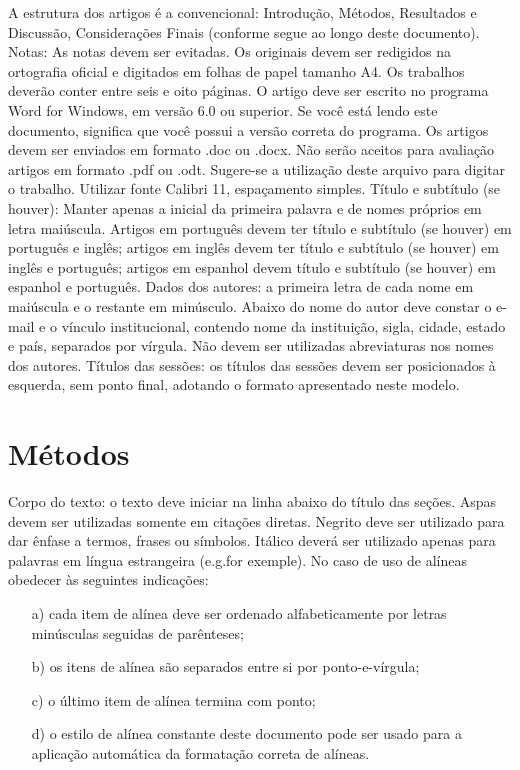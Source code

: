 \documentclass{modelo}
\begin{document}
 A estrutura dos artigos é a convencional: Introdução, Métodos, Resultados e Discussão, Considerações Finais (conforme segue ao longo deste documento).
 Notas: As notas devem ser evitadas.
 Os originais devem ser redigidos na ortografia oficial e digitados em folhas de papel tamanho A4. Os trabalhos deverão conter entre seis e oito páginas. O artigo deve ser escrito no programa Word for Windows, em versão 6.0 ou superior. Se você está lendo este documento, significa que você possui a versão correta do programa. Os artigos devem ser enviados em formato .doc ou .docx. Não serão aceitos para avaliação artigos em formato .pdf ou .odt. Sugere-se a utilização deste arquivo para digitar o trabalho.
 Utilizar fonte Calibri 11, espaçamento simples.
 Título e subtítulo (se houver): Manter apenas a inicial da primeira palavra e de nomes próprios em letra maiúscula. Artigos em português devem ter título e subtítulo (se houver) em português e inglês; artigos em inglês devem ter título e subtítulo (se houver) em inglês e português; artigos em espanhol devem título e subtítulo (se houver) em espanhol e português.
 Dados dos autores: a primeira letra de cada nome em maiúscula e o restante em minúsculo. Abaixo do nome do autor deve constar o e-mail e o vínculo institucional, contendo nome da instituição, sigla, cidade, estado e país, separados por vírgula. Não devem ser utilizadas abreviaturas nos nomes dos autores.
 Títulos das sessões: os títulos das sessões devem ser posicionados à esquerda, sem ponto final, adotando o formato apresentado neste modelo.
 
\section{Métodos}
Corpo do texto: o texto deve iniciar na linha abaixo do título das seções.
Aspas devem ser utilizadas somente em citações diretas. Negrito deve ser utilizado para dar ênfase a termos, frases ou símbolos. Itálico deverá ser utilizado apenas para palavras em língua estrangeira (e.g.for exemple).
No caso de uso de alíneas obedecer às seguintes indicações:
\begin{itemize}
\item[a)] cada item de alínea deve ser ordenado alfabeticamente por letras minúsculas seguidas de parênteses;
\item[b)] os itens de alínea são separados entre si por ponto-e-vírgula;
\item[c)] o último item de alínea termina com ponto;
\item[d)]o estilo de alínea constante deste documento pode ser usado para a aplicação automática da formatação correta de alíneas. 
\end{itemize}
 
\end{document}
